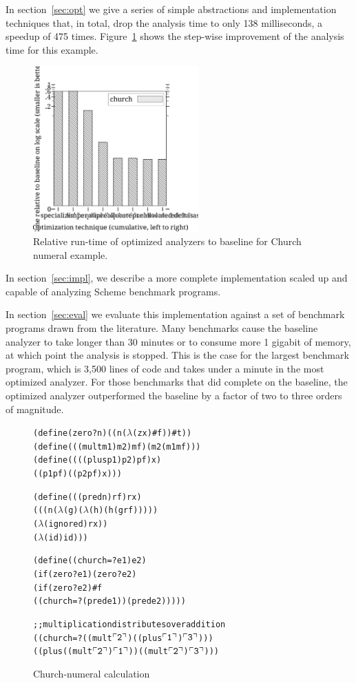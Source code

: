 \documentclass[preprint,onecolumn,9pt]{sigplanconf} %
\begin{document}
In section~\ref{sec:opt} we give a series of simple abstractions and
implementation techniques that, in total, drop the analysis time to
only 138 milliseconds, a speedup of 475 times.
Figure~\ref{fig:churchtime} shows the step-wise improvement of the
analysis time for this example.

\begin{figure}
\begin{center}
\includegraphics[width=2.5in]{rel-time-church.ps}
\end{center}
\caption{Relative run-time of
optimized analyzers to baseline for Church numeral example.}
\label{fig:churchtime}
\end{figure}

In section~\ref{sec:impl}, we describe a more complete implementation
scaled up and capable of analyzing Scheme benchmark programs.

In section~\ref{sec:eval} we evaluate this implementation against a
set of benchmark programs drawn from the literature.  Many benchmarks
cause the baseline analyzer to take longer than 30 minutes or to
consume more 1 gigabit of memory, at which point the analysis is
stopped.  This is the case for the largest benchmark program, which is
3,500 lines of code and takes under a minute in the most optimized
analyzer.  For those benchmarks that did complete on the baseline, the
optimized analyzer outperformed the baseline by a factor of
two to
three orders of magnitude.


\newcommand{\church}[1]{\(\ulcorner{\tt #1}\urcorner\)}

\begin{figure}
\begin{alltt}
(define (zero? n) ((n (\(\lambda\) (zx) #f)) #t))
(define (((mult m1) m2) mf) (m2 (m1 mf)))
(define ((((plus p1) p2) pf) x)
  ((p1 pf) ((p2 pf) x)))

(define (((pred n) rf) rx)
  (((n (\(\lambda\) (g) (\(\lambda\) (h) (h (g rf)))))
    (\(\lambda\) (ignored) rx))
   (\(\lambda\) (id) id)))

(define ((church=? e1) e2)
  (if (zero? e1) (zero? e2)
      (if (zero? e2) #f
          ((church=? (pred e1)) (pred e2)))))

;; multiplication distributes over addition
((church=? ((mult \church2) ((plus \church1) \church3)))
 ((plus ((mult \church2) \church1)) ((mult \church2) \church3)))
\end{alltt}
\caption{Church-numeral calculation}
\label{fig:church}
\end{figure}
\end{document}
